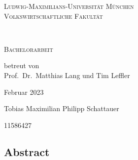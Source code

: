 \begin{titlepage}
    \vspace*{\fill}
    \centering

    \textsc{\Large Ludwig-Maximilians-Universität München}\\
    \textsc{Volkswirtschaftliche Fakultät}

    \vspace{3.2cm}

    \begin{doublespace}
        \makeatletter
        \textsc{ \Huge \titleDE}\\
        \textsc{\Large \subtitleDE}
        \makeatother
    \end{doublespace}


    \vspace{2.7cm}
    \huge \textsc{Bachelorarbeit}



    \vspace{0.3cm}
    \large \textrm{betreut von\\Prof.~Dr.~Matthias Lang und Tim Leffler}

    \vspace{2cm}
    \huge
    \textrm{Februar 2023}

    \vspace{2cm}
    \Large{\textrm{Tobias Maximilian Philipp Schattauer}}

    11586427

    \vspace*{\fill}
\end{titlepage}

\begin{titlepage}
    \null\vspace{3cm}
    \centering
    \begin{minipage}{0.8\textwidth}
        \section*{Abstract}
        
    \end{minipage}
\end{titlepage}



\tableofcontents
\newpage